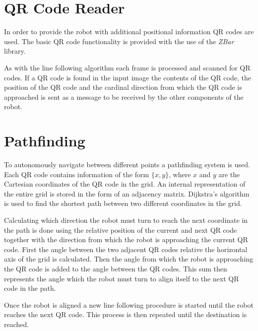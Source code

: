 \section*{QR Code Reader}
In order to provide the robot with additional positional information QR codes are used.
The basic QR code functionality is provided with the use of the \emph{ZBar}\cite{zbar} library.






As with the line following algorithm each frame is processed and scanned for QR codes.
If a QR code is found in the input image the contents of the QR code, the position of the QR code and the cardinal direction from which the QR code is approached is sent as a message to be received by the other components of the robot.




\section*{Pathfinding}
To autonomously navigate between different points a pathfinding system is used. 
Each QR code contains information of the form $\{x,y\}$, where $x$ and $y$ are the Cartesian coordinates of the QR code in the grid.
An internal representation of the entire grid is stored in the form of an adjacency matrix.
Dijkstra's algorithm is used to find the shortest path between two different coordinates in the grid. 

Calculating which direction the robot must turn to reach the next coordinate in the path is done using the relative position of the current and next QR code together with the direction from which the robot is approaching the current QR code.
First the angle between the two adjacent QR codes relative the horizontal axis of the grid is calculated.
Then the angle from which the robot is approaching the QR code is added to the angle between the QR codes.
This sum then represents the angle which the robot must turn to align itself to the next QR code in the path.

Once the robot is aligned a new line following procedure is started until the robot reaches the next QR code. This process is then repeated until the destination is reached.
